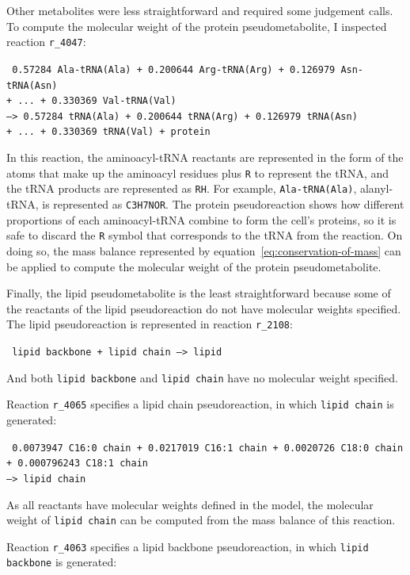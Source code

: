Other metabolites were less straightforward and required some judgement calls.
To compute the molecular weight of the protein pseudometabolite, I inspected reaction \texttt{r\_4047}:

\texttt{
  0.57284 Ala-tRNA(Ala) + 0.200644 Arg-tRNA(Arg) + 0.126979 Asn-tRNA(Asn)\\
  + ... + 0.330369 Val-tRNA(Val) \\
  --> 0.57284 tRNA(Ala) + 0.200644 tRNA(Arg) + 0.126979 tRNA(Asn) \\
  + ... + 0.330369 tRNA(Val) + protein
}

In this reaction, the aminoacyl-tRNA reactants are represented in the form of the atoms that make up the aminoacyl residues plus \texttt{R} to represent the tRNA, and the tRNA products are represented as \texttt{RH}.
For example, \texttt{Ala-tRNA(Ala)}, alanyl-tRNA, is represented as \texttt{C3H7NOR}.
The protein pseudoreaction shows how different proportions of each aminoacyl-tRNA combine to form the cell's proteins, so it is safe to discard the \texttt{R} symbol that corresponds to the tRNA from the reaction.
On doing so, the mass balance represented by equation~\ref{eq:conservation-of-mass} can be applied to compute the molecular weight of the protein pseudometabolite.

Finally, the lipid pseudometabolite is the least straightforward because some of the reactants of the lipid pseudoreaction do not have molecular weights specified.
The lipid pseudoreaction is represented in reaction \texttt{r\_2108}:

\texttt{
  lipid backbone + lipid chain --> lipid
}

And both \texttt{lipid backbone} and \texttt{lipid chain} have no molecular weight specified.

Reaction \texttt{r\_4065} specifies a lipid chain pseudoreaction, in which \texttt{lipid chain} is generated:

\texttt{
  0.0073947 C16:0 chain + 0.0217019 C16:1 chain + 0.0020726 C18:0 chain \\
  + 0.000796243 C18:1 chain \\
  --> lipid chain
}

As all reactants have molecular weights defined in the model, the molecular weight of \texttt{lipid chain} can be computed from the mass balance of this reaction.

Reaction \texttt{r\_4063} specifies a lipid backbone pseudoreaction, in which \texttt{lipid backbone} is generated:

